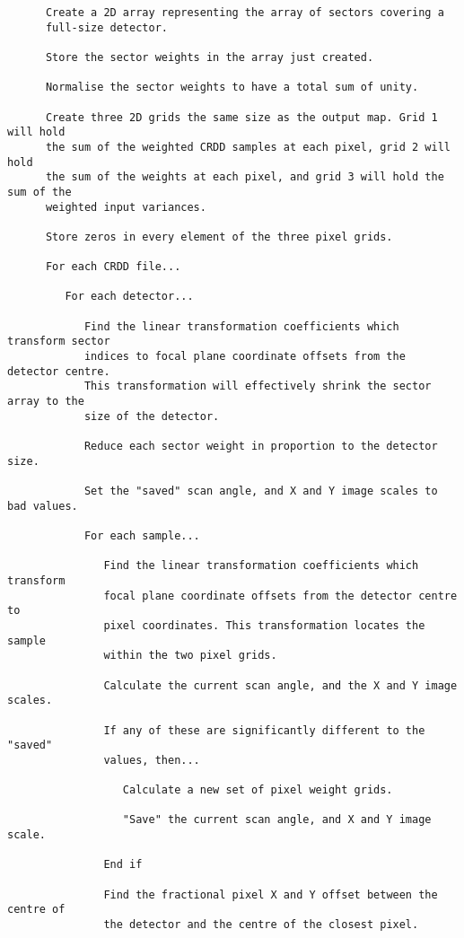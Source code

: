 \begin{verbatim}
      Create a 2D array representing the array of sectors covering a
      full-size detector.

      Store the sector weights in the array just created.

      Normalise the sector weights to have a total sum of unity.

      Create three 2D grids the same size as the output map. Grid 1 will hold
      the sum of the weighted CRDD samples at each pixel, grid 2 will hold
      the sum of the weights at each pixel, and grid 3 will hold the sum of the
      weighted input variances.

      Store zeros in every element of the three pixel grids.

      For each CRDD file...

         For each detector...

            Find the linear transformation coefficients which transform sector
            indices to focal plane coordinate offsets from the detector centre.
            This transformation will effectively shrink the sector array to the
            size of the detector.

            Reduce each sector weight in proportion to the detector size.

            Set the "saved" scan angle, and X and Y image scales to bad values.

            For each sample...

               Find the linear transformation coefficients which transform
               focal plane coordinate offsets from the detector centre to
               pixel coordinates. This transformation locates the sample
               within the two pixel grids.

               Calculate the current scan angle, and the X and Y image scales.

               If any of these are significantly different to the "saved"
               values, then...

                  Calculate a new set of pixel weight grids.

                  "Save" the current scan angle, and X and Y image scale.

               End if

               Find the fractional pixel X and Y offset between the centre of
               the detector and the centre of the closest pixel.


\end{verbatim}
